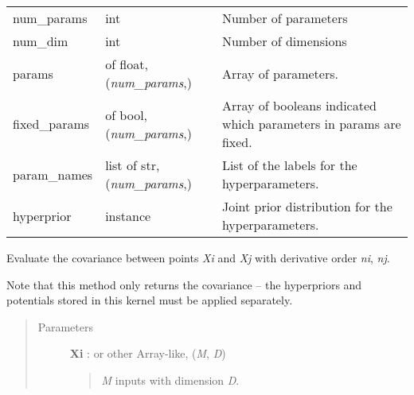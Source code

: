 \documentclass[letterpaper,10pt,english]{sphinxmanual}
\begin{document}
\begin{fulllineitems}
\begin{tabulary}{\linewidth}{|L|L|L|}
\hline

num\_params
 & 
int
 & 
Number of parameters
\\

num\_dim
 & 
int
 & 
Number of dimensions
\\

params
 & 
 of float, (\emph{num\_params},)
 & 
Array of parameters.
\\

fixed\_params
 & 
 of bool, (\emph{num\_params},)
 & 
Array of booleans indicated which parameters in params are fixed.
\\

param\_names
 & 
list of str, (\emph{num\_params},)
 & 
List of the labels for the hyperparameters.
\\

hyperprior
 & 
 instance
 & 
Joint prior distribution for the hyperparameters.
\\
\hline\end{tabulary}


\begin{fulllineitems}
\label{gptools.kernel:gptools.kernel.core.Kernel.param_bounds}
\end{fulllineitems}


\begin{fulllineitems}
\label{gptools.kernel:gptools.kernel.core.Kernel.__call__}
Evaluate the covariance between points \emph{Xi} and \emph{Xj} with derivative order \emph{ni}, \emph{nj}.

Note that this method only returns the covariance -- the hyperpriors
and potentials stored in this kernel must be applied separately.
\begin{quote}\begin{description}
\item[{Parameters}] \leavevmode
\textbf{Xi} :  or other Array-like, (\emph{M}, \emph{D})
\begin{quote}

\emph{M} inputs with dimension \emph{D}.
\end{quote}


\end{description}
\end{quote}
\end{fulllineitems}
\end{fulllineitems}
\end{document}
